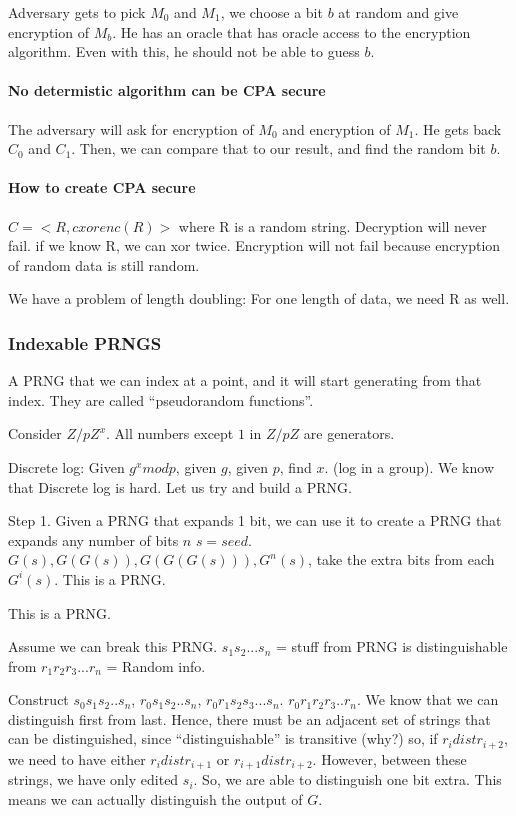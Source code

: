 Adversary gets to pick $M_0$ and $M_1$, we choose a bit $b$ at random and give encryption of $M_b$. He has an oracle that has oracle access to the encryption algorithm. Even with this, he should not be able to guess $b$.

\paragraph{No determistic algorithm can be CPA secure}

The adversary will ask for encryption of $M_0$ and encryption of $M_1$. He gets back $C_0$ and $C_1$. Then, we can compare that to our result, and find the random bit $b$.


\paragraph{How to create CPA secure}
$C = <R, c xor enc(R)>$ where R is a random string.
Decryption will never fail. if we know R, we can xor twice.
Encryption will not fail because encryption of random data is still random.

We have a problem of length doubling: For one length of data, we need R as well.

\subsubsection{Indexable PRNGS}
A PRNG that we can index at a point, and it will start generating from that index. They are called ``pseudorandom functions''.

Consider $Z/pZ^x$. All numbers except $1$ in $Z/pZ$ are generators.

Discrete log: Given $g^x mod p$, given $g$, given $p$, find $x$. (log in a group). We know that Discrete log is hard. Let us try and build a PRNG.


Step 1. Given a PRNG that expands 1 bit, we can use it to create a PRNG that expands any number of bits $n$
$s = seed$. 
$G(s), G(G(s)), G(G(G(s))), G^n(s)$, take the extra bits from each $G^i(s)$. This is a PRNG.

This is a PRNG.

Assume we can break this PRNG. $s_1 s_2 ... s_n$ = stuff from PRNG is distinguishable from $r_1 r_2 r_3 ... r_n$ = Random info.

Construct $s_0 s_1 s_2 .. s_n$, $r_0 s_1 s_2.. s_n$, $r_0 r_1 s_2 s_3 ... s_n$. $r_0 r_1 r_2 r_3 .. r_n$. We know that we can
distinguish first from last. Hence, there must be an adjacent set of strings that can be distinguished, since ``distinguishable'' is transitive (why?)
so, if $r_i  dist r_{i+2}$, we need to have either $r_i dist r_{i + 1}$ or $r_{i + 1} dist r_{i + 2}$. However, between these strings, we have only edited $s_i$.
So, we are able to distinguish one bit extra. This means we can actually distinguish the output of $G$.


